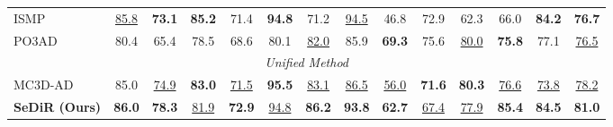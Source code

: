 \begin{table}[!ht]
{\begin{tabular}{l|cccccccccccc|c}
ISMP                 & \underline{85.8} & \textbf{73.1} & \textbf{85.2} & 71.4 & \textbf{94.8} & 71.2 & \underline{94.5} & 46.8 & 72.9 & 62.3 & 66.0 & \textbf{84.2} & \textbf{76.7} \\
PO3AD                & 80.4 & 65.4 & 78.5 & 68.6 & 80.1 & \underline{82.0} & 85.9 & \textbf{69.3} & 75.6 & \underline{80.0} & \textbf{75.8} & 77.1 & \underline{76.5} \\
\midrule
\multicolumn{14}{c}{\textit{Unified Method}}\\
\midrule
MC3D-AD              & 85.0 & \underline{74.9} & \textbf{83.0} & \underline{71.5} & \textbf{95.5} & \underline{83.1} & \underline{86.5} & \underline{56.0} & \textbf{71.6} & \textbf{80.3} & \underline{76.6} & \underline{73.8} & \underline{78.2} \\
\rowcolor{gray!20}
\textbf{SeDiR (Ours)}        & \textbf{86.0} & \textbf{78.3} & \underline{81.9} & \textbf{72.9} & \underline{94.8} & \textbf{86.2} & \textbf{93.8} & \textbf{62.7} & \underline{67.4} & \underline{77.9} & \textbf{85.4} & \textbf{84.5} & \textbf{81.0} \\
\bottomrule
\end{tabular}
}
\label{tab:Real3D_combined}
\end{table}
